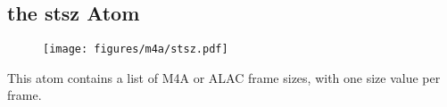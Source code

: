 \subsection{the stsz Atom}
\begin{figure}[h]
  \texttt{[image: figures/m4a/stsz.pdf]}
\end{figure}
\par
\noindent
This atom contains a list of M4A or ALAC frame sizes,
with one size value per frame.
